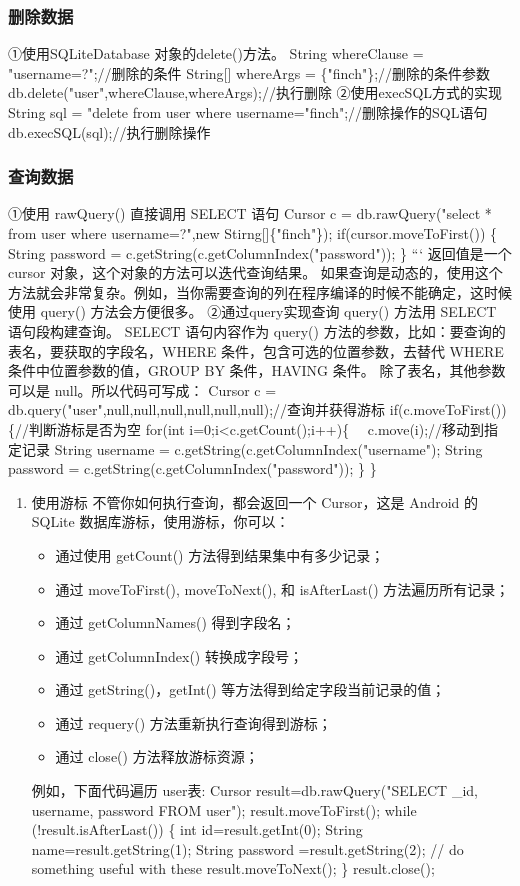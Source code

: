 \documentclass[9pt, b5paper]{article}
\begin{document}
\subsubsection{删除数据}
\label{sec-15-3-5}
①使用SQLiteDatabase 对象的delete()方法。
String whereClause = "username=?";//删除的条件
String[] whereArgs = \{"finch"\};//删除的条件参数
db.delete("user",whereClause,whereArgs);//执行删除
②使用execSQL方式的实现
String sql = "delete from user where username="finch";//删除操作的SQL语句
db.execSQL(sql);//执行删除操作
\subsubsection{查询数据}
\label{sec-15-3-6}
①使用 rawQuery() 直接调用 SELECT 语句
Cursor c = db.rawQuery("select * from user where username=?",new Stirng[]\{"finch"\});
if(cursor.moveToFirst()) \{
    String password = c.getString(c.getColumnIndex("password"));
\}
``` 
返回值是一个 cursor 对象，这个对象的方法可以迭代查询结果。
如果查询是动态的，使用这个方法就会非常复杂。例如，当你需要查询的列在程序编译的时候不能确定，这时候使用 query() 方法会方便很多。
②通过query实现查询
query() 方法用 SELECT 语句段构建查询。
SELECT 语句内容作为 query() 方法的参数，比如：要查询的表名，要获取的字段名，WHERE 条件，包含可选的位置参数，去替代 WHERE 条件中位置参数的值，GROUP BY 条件，HAVING 条件。
除了表名，其他参数可以是 null。所以代码可写成：
Cursor c = db.query("user",null,null,null,null,null,null);//查询并获得游标
if(c.moveToFirst())\{//判断游标是否为空
    for(int i=0;i<c.getCount();i++)\{　
c.move(i);//移动到指定记录
String username = c.getString(c.getColumnIndex("username");
String password = c.getString(c.getColumnIndex("password"));
    \}
\}
\begin{enumerate}
\item 使用游标
\label{sec-15-3-6-1}
不管你如何执行查询，都会返回一个 Cursor，这是 Android 的 SQLite 数据库游标，使用游标，你可以：　　
\begin{itemize}
\item 通过使用 getCount() 方法得到结果集中有多少记录；　

\item 通过 moveToFirst(), moveToNext(), 和 isAfterLast() 方法遍历所有记录；
\item 通过 getColumnNames() 得到字段名；
\item 通过 getColumnIndex() 转换成字段号；
\item 通过 getString()，getInt() 等方法得到给定字段当前记录的值；
\item 通过 requery() 方法重新执行查询得到游标；
\item 通过 close() 方法释放游标资源；
\end{itemize}

例如，下面代码遍历 user表:
 Cursor result=db.rawQuery("SELECT \_id, username, password FROM user"); 
    result.moveToFirst(); 
    while (!result.isAfterLast()) \{ 
        int id=result.getInt(0); 
        String name=result.getString(1); 
        String password =result.getString(2); 
        // do something useful with these 
        result.moveToNext(); 
      \} 
      result.close();
\end{enumerate}
\end{document}
